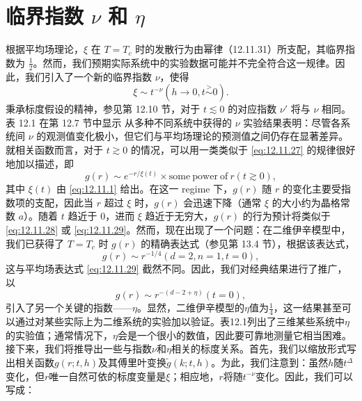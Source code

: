 \section{\texorpdfstring{临界指数 \(\nu\) 和 \(\eta\)}{临界指数 \textbackslash nu 和 \textbackslash eta}}\label{ux4e34ux754cux6307ux6570-nu-ux548c-eta}
根据平均场理论，\(\xi\) 在 \(T=T_{c}\) 时的发散行为由幂律（12.11.31）所支配，其临界指数为 \(\frac{1}{2}\)。然而，我们预期实际系统中的实验数据可能并不完全符合这一规律。因此，我们引入了一个新的临界指数 \(\nu\)，使得
\begin{equation}\tag{12.12.1}\label{eq:12.12.1}
\xi \sim t ^{- \nu}  ( h \to 0 , t \stackrel { > } { \sim } 0 ) .
\end{equation}
秉承标度假设的精神，参见第 12.10 节，对于 \(t \lesssim 0\) 的对应指数 \(\nu'\) 将与 \(\nu\) 相同。表 12.1 在第 12.7 节中显示
从多种不同系统中获得的 \(\nu\) 实验结果表明：尽管各系统间 \(\nu\) 的观测值变化极小，但它们与平均场理论的预测值之间仍存在显著差异。
就相关函数而言，对于 \(t \gtrsim 0\) 的情况，可以用一类类似于 \autoref{eq:12.11.27} 的规律很好地加以描述，即
\begin{equation}\tag{12.12.2}\label{eq:12.12.2}
g ( r ) \sim e ^{- r / \xi ( t )} \times \mathrm { s o m e ~ p o w e r ~ o f ~ } r  ( t \gtrsim 0 ) ,
\end{equation}
其中 \(\xi(t)\) 由 \autoref{eq:12.11.1} 给出。在这一 regime 下，\(g(r)\) 随 \(r\) 的变化主要受指数项的支配，因此当 \(r\) 超过 \(\xi\) 时，\(g(r)\) 会迅速下降（通常 \(\xi\) 的大小约为晶格常数 \(a\)）。随着 \(t\) 趋近于 0，进而 \(\xi\) 趋近于无穷大，\(g(r)\) 的行为预计将类似于 \autoref{eq:12.11.28} 或 \autoref{eq:12.11.29}。然而，现在出现了一个问题：在二维伊辛模型中，我们已获得了 \(T = T_c\) 时 \(g(r)\) 的精确表达式（参见第 13.4 节），根据该表达式，
\begin{equation}\tag{12.12.3}\label{eq:12.12.3}
g ( r ) \sim r ^{- 1 / 4}  ( d = 2 , n = 1 , t = 0 ) ,
\end{equation}
这与平均场表达式 \autoref{eq:12.11.29} 截然不同。因此，我们对经典结果进行了推广，以
\begin{equation}\tag{12.12.4}\label{eq:12.12.4}
g ( r ) \sim r ^{- ( d - 2 + \eta )}  ( t = 0 ) ,
\end{equation}
引入了另一个关键的指数——\(\eta\)。显然，二维伊辛模型的\(\eta\)值为\(\frac{1}{4}\)，这一结果甚至可以通过对某些实际上为二维系统的实验加以验证。表12.1列出了三维某些系统中\(\eta\)的实验值；通常情况下，\(\eta\)会是一个很小的数值，因此要可靠地测量它相当困难。
接下来，我们将推导出一些与指数\(\nu\)和\(\eta\)相关的标度关系。首先，我们以缩放形式写出相关函数\(g(r; t, h)\)及其傅里叶变换\(\tilde{g}(k; t, h)\)。为此，我们注意到：虽然\(h\)随\(t^{\Delta}\)变化，但\(r\)唯一自然可依的标度变量是\(\xi\)；相应地，\(r\)将随\(t^{-\nu}\)变化。因此，我们可以写成：
